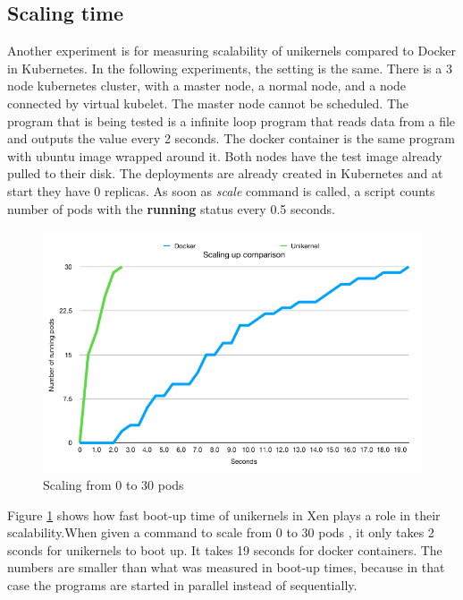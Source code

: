 \subsection{Scaling time}
Another experiment is for measuring scalability of unikernels compared to Docker in Kubernetes. In the following experiments, the setting is the same. There is a 3 node kubernetes cluster, with a master node, a normal node, and a node connected by virtual kubelet. The master node cannot be scheduled. The program that is being tested is a infinite loop program that reads data from a file and outputs the value every 2 seconds. The docker container is the same program with ubuntu image wrapped around it. Both nodes have the test image already pulled to their disk. The deployments are already created in Kubernetes and at start they have 0 replicas. As soon as \textit{scale} command is called, a script counts number of pods with the \textbf{running} status every 0.5 seconds.
\begin{figure}[htpb]
  \centering
  \includegraphics[width=1\textwidth]{figures/scales/scale-up-30.png}
  \caption{Scaling from 0 to 30 pods } \label{fig:scale-up-30}
\end{figure}


Figure \ref{fig:scale-up-30} shows how fast boot-up time of unikernels in Xen plays a role in their scalability.When given a command to scale from 0 to 30 pods , it only takes 2 sconds for unikernels to boot up. It takes 19 seconds for docker containers. The numbers are smaller than what was measured in boot-up times, because in that case the programs are started in parallel instead of sequentially. 

